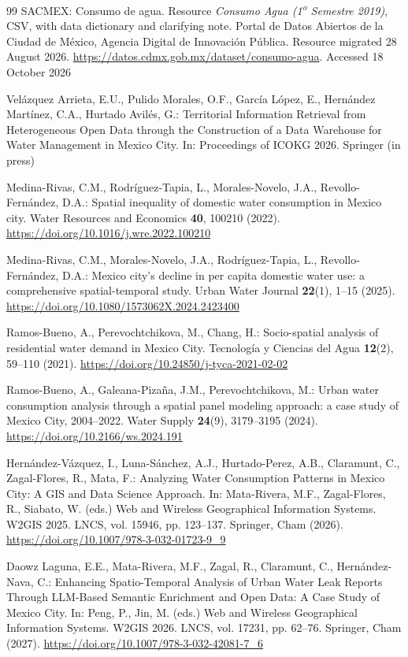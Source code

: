 \documentclass[runningheads]{llncs}
\renewcommand{\_}{\origunderscore\allowbreak}
\begin{document}
\begin{thebibliography}{99}
 SACMEX: Consumo de agua. Resource \emph{Consumo Agua (1\textsuperscript{o} Semestre 2019)}, CSV, with data dictionary and clarifying note. Portal de Datos Abiertos de la Ciudad de M\'exico, Agencia Digital de Innovaci\'on P\'ublica. Resource migrated 28 August 2026. \url{https://datos.cdmx.gob.mx/dataset/consumo-agua}. Accessed 18 October 2026

 Vel\'azquez Arrieta, E.U., Pulido Morales, O.F., Garc\'ia L\'opez, E., Hern\'andez Mart\'inez, C.A., Hurtado Avil\'es, G.: Territorial Information Retrieval from Heterogeneous Open Data through the Construction of a Data Warehouse for Water Management in Mexico City. In: Proceedings of ICOKG 2026. Springer (in press)

 Medina-Rivas, C.M., Rodr\'iguez-Tapia, L., Morales-Novelo, J.A., Revollo-Fern\'andez, D.A.: Spatial inequality of domestic water consumption in Mexico city. Water Resources and Economics \textbf{40}, 100210 (2022). \url{https://doi.org/10.1016/j.wre.2022.100210}

 Medina-Rivas, C.M., Morales-Novelo, J.A., Rodr\'iguez-Tapia, L., Revollo-Fern\'andez, D.A.: Mexico city's decline in per capita domestic water use: a comprehensive spatial-temporal study. Urban Water Journal \textbf{22}(1), 1--15 (2025). \url{https://doi.org/10.1080/1573062X.2024.2423400}

 Ramos-Bueno, A., Perevochtchikova, M., Chang, H.: Socio-spatial analysis of residential water demand in Mexico City. Tecnolog\'ia y Ciencias del Agua \textbf{12}(2), 59--110 (2021). \url{https://doi.org/10.24850/j-tyca-2021-02-02}

 Ramos-Bueno, A., Galeana-Pizaña, J.M., Perevochtchikova, M.: Urban water consumption analysis through a spatial panel modeling approach: a case study of Mexico City, 2004--2022. Water Supply \textbf{24}(9), 3179--3195 (2024). \url{https://doi.org/10.2166/ws.2024.191}

 Hern\'andez-V\'azquez, I., Luna-S\'anchez, A.J., Hurtado-Perez, A.B., Claramunt, C., Zagal-Flores, R., Mata, F.: Analyzing Water Consumption Patterns in Mexico City: A GIS and Data Science Approach. In: Mata-Rivera, M.F., Zagal-Flores, R., Siabato, W. (eds.) Web and Wireless Geographical Information Systems. W2GIS 2025. LNCS, vol. 15946, pp. 123--137. Springer, Cham (2026). \url{https://doi.org/10.1007/978-3-032-01723-9_9}

 Daowz Laguna, E.E., Mata-Rivera, M.F., Zagal, R., Claramunt, C., Hern\'andez-Nava, C.: Enhancing Spatio-Temporal Analysis of Urban Water Leak Reports Through LLM-Based Semantic Enrichment and Open Data: A Case Study of Mexico City. In: Peng, P., Jin, M. (eds.) Web and Wireless Geographical Information Systems. W2GIS 2026. LNCS, vol. 17231, pp. 62--76. Springer, Cham (2027). \url{https://doi.org/10.1007/978-3-032-42081-7_6}


\end{thebibliography}
\end{document}
